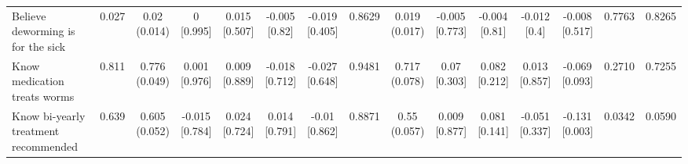 {\begin{tabular}[t]{lcccccccccccccc}
\hspace{1em}Believe deworming is for the sick & 0.027 & \makecell[c]{0.02\\(0.014)} & \makecell[c]{0\\{[0.995]}} & \makecell[c]{0.015\\{[0.507]}} & \makecell[c]{-0.005\\{[0.82]}} & \makecell[c]{-0.019\\{[0.405]}} & 0.8629 & \makecell[c]{0.019\\(0.017)} & \makecell[c]{-0.005\\{[0.773]}} & \makecell[c]{-0.004\\{[0.81]}} & \makecell[c]{-0.012\\{[0.4]}} & \makecell[c]{-0.008\\{[0.517]}} & 0.7763 & 0.8265\\
\hspace{1em}Know medication treats worms & 0.811 & \makecell[c]{0.776\\(0.049)} & \makecell[c]{0.001\\{[0.976]}} & \makecell[c]{0.009\\{[0.889]}} & \makecell[c]{-0.018\\{[0.712]}} & \makecell[c]{-0.027\\{[0.648]}} & 0.9481 & \makecell[c]{0.717\\(0.078)} & \makecell[c]{0.07\\{[0.303]}} & \makecell[c]{0.082\\{[0.212]}} & \makecell[c]{0.013\\{[0.857]}} & \makecell[c]{-0.069\\{[0.093]}} & 0.2710 & 0.7255\\
\hspace{1em}Know bi-yearly treatment recommended & 0.639 & \makecell[c]{0.605\\(0.052)} & \makecell[c]{-0.015\\{[0.784]}} & \makecell[c]{0.024\\{[0.724]}} & \makecell[c]{0.014\\{[0.791]}} & \makecell[c]{-0.01\\{[0.862]}} & 0.8871 & \makecell[c]{0.55\\(0.057)} & \makecell[c]{0.009\\{[0.877]}} & \makecell[c]{0.081\\{[0.141]}} & \makecell[c]{-0.051\\{[0.337]}} & \makecell[c]{-0.131\\{[0.003]}} & 0.0342 & 0.0590\\

\end{tabular}}
